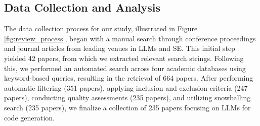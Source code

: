 \subsection{Data Collection and Analysis}
The data collection process for our study, illustrated in Figure \ref{fig:review_process}, began with a manual search through conference proceedings and journal articles from leading venues in LLMs and SE. This initial step yielded 42 papers, from which we extracted relevant search strings. Following this, we performed an automated search across four academic databases using keyword-based queries, resulting in the retrieval of 664 papers. After performing automatic filtering (351 papers), applying inclusion and exclusion criteria (247 papers), conducting quality assessments (235 papers), and utilizing snowballing search (235 papers), we finalize a collection of 235 papers focusing on LLMs for code generation.

